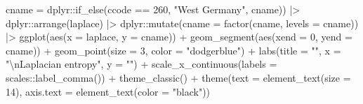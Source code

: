 \documentclass[
  12,
  letterpaper,
  DIV=11,
  numbers=noendperiod]{scrartcl}
\newenvironment{Shaded}{\begin{snugshade}}{\end{snugshade}}
\newcommand{\AttributeTok}[1]{\textcolor[rgb]{0.40,0.45,0.13}{#1}}
\newcommand{\DecValTok}[1]{\textcolor[rgb]{0.68,0.00,0.00}{#1}}
\newcommand{\FunctionTok}[1]{\textcolor[rgb]{0.28,0.35,0.67}{#1}}
\newcommand{\NormalTok}[1]{\textcolor[rgb]{0.00,0.23,0.31}{#1}}
\newcommand{\SpecialCharTok}[1]{\textcolor[rgb]{0.37,0.37,0.37}{#1}}
\newcommand{\StringTok}[1]{\textcolor[rgb]{0.13,0.47,0.30}{#1}}
\begin{document}
\begin{Shaded}
\begin{Highlighting}[numbers=left,,]
                \AttributeTok{cname =}\NormalTok{ dplyr}\SpecialCharTok{::}\FunctionTok{if\_else}\NormalTok{(ccode }\SpecialCharTok{==} \DecValTok{260}\NormalTok{, }\StringTok{"West Germany"}\NormalTok{, cname)) }\SpecialCharTok{|\textgreater{}}
\NormalTok{  dplyr}\SpecialCharTok{::}\FunctionTok{arrange}\NormalTok{(laplace) }\SpecialCharTok{|\textgreater{}}
\NormalTok{  dplyr}\SpecialCharTok{::}\FunctionTok{mutate}\NormalTok{(}\AttributeTok{cname =} \FunctionTok{factor}\NormalTok{(cname, }\AttributeTok{levels =}\NormalTok{ cname)) }\SpecialCharTok{|\textgreater{}}
  \FunctionTok{ggplot}\NormalTok{(}\FunctionTok{aes}\NormalTok{(}\AttributeTok{x =}\NormalTok{ laplace,}
             \AttributeTok{y =}\NormalTok{ cname)) }\SpecialCharTok{+}
  \FunctionTok{geom\_segment}\NormalTok{(}\FunctionTok{aes}\NormalTok{(}\AttributeTok{xend =} \DecValTok{0}\NormalTok{, }\AttributeTok{yend =}\NormalTok{ cname)) }\SpecialCharTok{+}
  \FunctionTok{geom\_point}\NormalTok{(}\AttributeTok{size =} \DecValTok{3}\NormalTok{, }\AttributeTok{color =} \StringTok{"dodgerblue"}\NormalTok{) }\SpecialCharTok{+}
  \FunctionTok{labs}\NormalTok{(}\AttributeTok{title =} \StringTok{""}\NormalTok{,}
       \AttributeTok{x =} \StringTok{"}\SpecialCharTok{\textbackslash{}n}\StringTok{Laplacian entropy"}\NormalTok{,}
       \AttributeTok{y =} \StringTok{""}\NormalTok{) }\SpecialCharTok{+}
  \FunctionTok{scale\_x\_continuous}\NormalTok{(}\AttributeTok{labels =}\NormalTok{ scales}\SpecialCharTok{::}\FunctionTok{label\_comma}\NormalTok{()) }\SpecialCharTok{+}
  \FunctionTok{theme\_classic}\NormalTok{() }\SpecialCharTok{+}
  \FunctionTok{theme}\NormalTok{(}\AttributeTok{text =} \FunctionTok{element\_text}\NormalTok{(}\AttributeTok{size =} \DecValTok{14}\NormalTok{),}
        \AttributeTok{axis.text =} \FunctionTok{element\_text}\NormalTok{(}\AttributeTok{color =} \StringTok{"black"}\NormalTok{))}
\end{Highlighting}
\end{Shaded}
\end{document}
